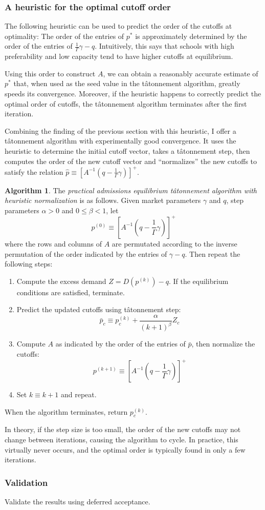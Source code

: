 \documentclass[12pt]{article}
\theoremstyle{definition}
\newtheorem{algorithm}{Algorithm}
\begin{document}
\subsubsection{A heuristic for the optimal cutoff order} 
The following heuristic can be used to predict the order of the cutoffs at optimality: The order of the entries of $p^*$ is approximately determined by the order of the entries of $\frac{1}{\Gamma}\gamma - q$. Intuitively, this says that schools with high preferability and low capacity tend to have higher cutoffs at equilibrium.

Using this order to construct $A$, we can obtain a reasonably accurate estimate of $p^*$ that, when used as the seed value in the t\^{a}tonnement algorithm, greatly speeds its convergence. Moreover, if the heuristic happens to correctly predict the optimal order of cutoffs, the t\^{a}tonnement algorithm terminates after the first iteration. 

Combining the finding of the previous section with this heuristic, I offer a t\^{a}tonnement algorithm with experimentally good convergence. It uses the heuristic to determine the initial cutoff vector, takes a t\^{a}tonnement step, then computes the order of the new cutoff vector and ``normalizes'' the new cutoffs to satisfy the relation $\hat p \equiv \left[A^{-1} (q - \frac{1}{\Gamma} \gamma) \right]^+$.
\begin{algorithm}
The \emph{practical admissions equilibrium t\^{a}tonnement algorithm with heuristic normalization} is as follows. Given market parameters $\gamma$ and $q$, step parameters $\alpha >0$ and $0 \leq \beta < 1$, let \[p^{(0)} \equiv \left[A^{-1} (q - \frac{1}{\Gamma} \gamma) \right]^+ \]
where the rows and columns of $A$ are permutated according to the inverse permutation of the order indicated by the entries of $\gamma - q$. Then repeat the following steps:
\begin{enumerate}
\item Compute the excess demand $Z = D (p^{(k)}) - q$. If the equilibrium conditions are satisfied, terminate.
\item Predict the updated cutoffs using t\^{a}tonnement step:
	\[ \bar p_c \equiv p_c^{(k)} + \frac{\alpha}{(k+1)^\beta} Z_c\]
\item Compute $A$ as indicated by the order of the entries of $\bar p$, then normalize the cutoffs:
	\[p^{(k+1)} \equiv \left[A^{-1} (q - \frac{1}{\Gamma} \gamma) \right]^+ \]
\item Set $k \equiv k+1$ and repeat. 
\end{enumerate}
When the algorithm terminates, return $p_c^{(k)}$. 
\end{algorithm}
In theory, if the step size is too small, the order of the new cutoffs may not change between iterations, causing the algorithm to cycle. In practice, this virtually never occurs, and the optimal order is typically found in only a few iterations. 

\subsubsection{Validation}
Validate the results using deferred acceptance. 
\end{document}
